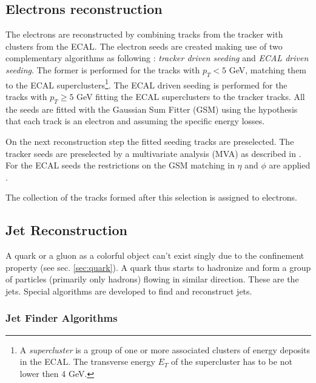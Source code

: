 \subsection{Electrons reconstruction}\label{ssec:ElRec}

The electrons are reconstructed by combining tracks from the tracker with clusters from the ECAL. The electron seeds
are created making use of two complementary algorithms as following \cite{CMS-PAS-EGM-10-004}: \textit{tracker driven seeding}
and \textit{ECAL driven seeding}. The former is performed for the tracks with $p_{T} < 5$ GeV, matching them to the ECAL superclusters\footnote
{A \textit{supercluster} is a group of one or more associated clusters of energy deposits in the ECAL. The transverse energy $E_{T}$
of the supercluster has to be not lower then 4 GeV.}. The ECAL driven seeding is performed for the tracks with $p_{T} \geq 5$ GeV
fitting the ECAL superclusters to the tracker tracks. All the seeds are fitted with the Gaussian Sum Fitter (GSM) \cite{GSF_Electron_Reconstruction_CMS}
using the hypothesis that each track is an electron and assuming the specific energy losses.

On the next reconstruction step the fitted seeding tracks are preselected. The tracker seeds are preselected by a multivariate analysis 
(MVA) as described in \cite{CMS:2010byl}. For the ECAL seeds the restrictions on the GSM matching in $\eta$ and $\phi$ are applied \cite{Baffioni:2006cd}.

The collection of the tracks formed after this selection is assigned to electrons.

\subsection{Jet Reconstruction}

A quark or a gluon as a colorful object can't exist singly due to the confinement property (see sec. \ref{sec:quark}).
A quark thus starts to hadronize and form a group of particles (primarily only hadrons) flowing in similar direction. These are the jets. Special algorithms are developed
to find and reconstruct jets.

\subsubsection{Jet Finder Algorithms}\label{sec:JetAlgo}

